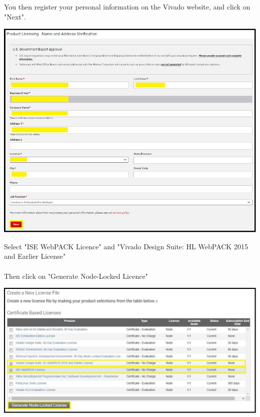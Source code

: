 \begin{minipage}{\linewidth}
  You then register your personal information on the Vivado website, and click on "Next".
  \\
  \begin{center}
    \includegraphics[width=0.7\linewidth]{images/VivadoInstimg025.jpg}
  \end{center}
\end{minipage}


\begin{minipage}{\linewidth}
Select "ISE WebPACK Licence" and "Vivado Design Suite: HL WebPACK 2015 and Earlier License" \\
\\
Then click on "Generate Node-Locked Licence"
\\
\begin{center}
  \includegraphics[width=\linewidth]{images/VivadoInstimg026.jpg}
\end{center}
\end{minipage}

